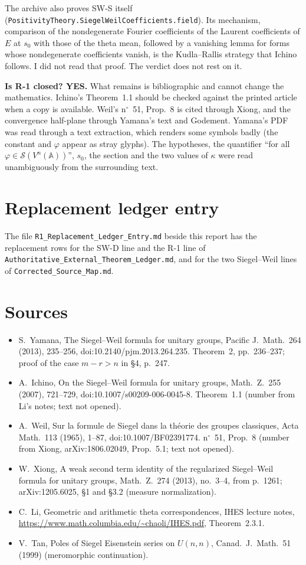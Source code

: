 \documentclass[11pt]{article}
\newcommand{\lean}[1]{\nolinkurl{#1}}
\theoremstyle{definition}
\begin{document}
The archive also proves SW-S itself (\lean{PositivityTheory.SiegelWeilCoefficients.field}). Its mechanism, comparison of the nondegenerate Fourier coefficients of the Laurent coefficients of $E$ at $s_0$ with those of the theta mean, followed by a vanishing lemma for forms whose nondegenerate coefficients vanish, is the Kudla--Rallis strategy that Ichino follows. I did not read that proof. The verdict does not rest on it.

\textbf{Is R-1 closed? YES.} What remains is bibliographic and cannot change the mathematics. Ichino's Theorem~1.1 should be checked against the printed article when a copy is available. Weil's n$^\circ$~51, Prop.~8 is cited through Xiong, and the convergence half-plane through Yamana's text and Godement. Yamana's PDF was read through a text extraction, which renders some symbols badly (the constant and $\varphi$ appear as stray glyphs). The hypotheses, the quantifier ``for all $\varphi\in\mathcal S(V^n(\mathbb A))$'', $s_0$, the section and the two values of $\kappa$ were read unambiguously from the surrounding text.

\section*{Replacement ledger entry}

The file \texttt{R1\_Replacement\_Ledger\_Entry.md} beside this report has the replacement rows for the SW-D line and the R-1 line of \texttt{Authoritative\_External\_Theorem\_Ledger.md}, and for the two Siegel--Weil lines of \texttt{Corrected\_Source\_Map.md}.

\section*{Sources}
\begin{itemize}[leftmargin=*]
\item S.~Yamana, The Siegel--Weil formula for unitary groups, Pacific J.\ Math.\ 264 (2013), 235--256, doi:10.2140/pjm.2013.264.235. Theorem~2, pp.~236--237; proof of the case $m-r>n$ in §4, p.~247.
\item A.~Ichino, On the Siegel--Weil formula for unitary groups, Math.\ Z.\ 255 (2007), 721--729, doi:10.1007/s00209-006-0045-8. Theorem~1.1 (number from Li's notes; text not opened).
\item A.~Weil, Sur la formule de Siegel dans la théorie des groupes classiques, Acta Math.\ 113 (1965), 1--87, doi:10.1007/BF02391774. n$^\circ$~51, Prop.~8 (number from Xiong, arXiv:1806.02049, Prop.~5.1; text not opened).
\item W.~Xiong, A weak second term identity of the regularized Siegel--Weil formula for unitary groups, Math.\ Z.\ 274 (2013), no.~3--4, from p.~1261; arXiv:1205.6025, §1 and §3.2 (measure normalization).
\item C.~Li, Geometric and arithmetic theta correspondences, IHES lecture notes, \url{https://www.math.columbia.edu/~chaoli/IHES.pdf}, Theorem~2.3.1.
\item V.~Tan, Poles of Siegel Eisenstein series on $U(n,n)$, Canad.\ J.\ Math.\ 51 (1999) (meromorphic continuation).
\end{itemize}
\end{document}
